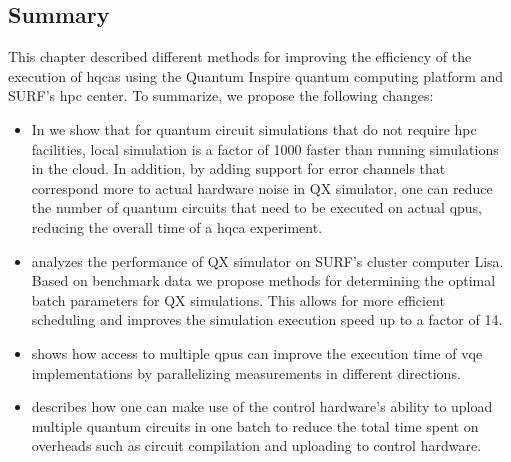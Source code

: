 \subsection{Summary}
This chapter described different methods for improving the efficiency of the execution of \glspl{hqca} using the Quantum Inspire quantum computing platform and SURF's \gls{hpc} center.
To summarize, we propose the following changes:
\begin{itemize}
    \item
    In  we show that for quantum circuit simulations that do not require \gls{hpc} facilities, local simulation is a factor of 1000 faster than running simulations in the cloud.
    In addition, by adding support for error channels that correspond more to actual hardware noise in QX simulator, one can reduce the number of quantum circuits that need to be executed on actual \glspl{qpu}, reducing the overall time of a \gls{hqca} experiment.
    \item
     analyzes the performance of QX simulator on SURF's cluster computer Lisa.
    Based on benchmark data we propose methods for determining the optimal batch parameters for QX simulations.
    This allows for more efficient scheduling and improves the simulation execution speed up to a factor of 14.
    \item
     shows how access to multiple \glspl{qpu} can improve the execution time of \gls{vqe} implementations by parallelizing measurements in different directions.
    \item
     describes how one can make use of the control hardware's ability to upload multiple quantum circuits in one batch to reduce the total time spent on overheads such as circuit compilation and uploading to control hardware.
\end{itemize}
